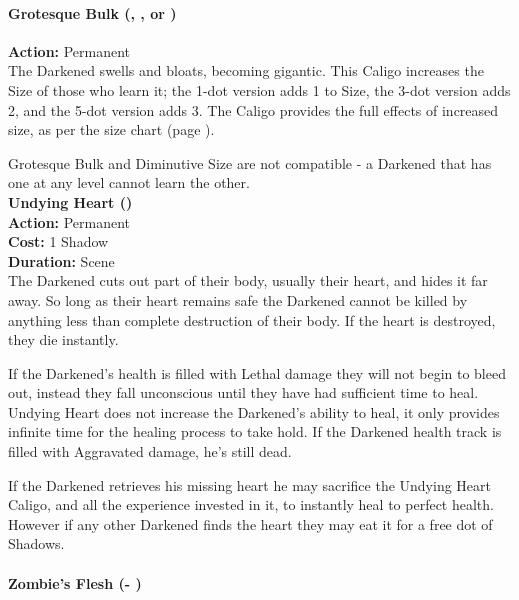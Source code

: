 \paragraph*{Grotesque Bulk (\textbullet, \textbullet\textbullet\textbullet, or \textbullet\textbullet\textbullet\textbullet\textbullet)} 

\noindent \textbf{Action:} Permanent \\

\noindent The Darkened swells and bloats, becoming gigantic. This Caligo increases the Size of those who learn it; the 1-dot version adds 1 to Size, the 3-dot version adds 2, and the 5-dot version adds 3. The Caligo provides the full effects of increased size, as per the size chart (page \pageref{SizeTable}).

Grotesque Bulk and Diminutive Size are not compatible - a Darkened that has one at any level cannot learn the other. \\

\noindent \textbf{Undying Heart (\textbullet\textbullet\textbullet\textbullet\textbullet)} \\

\noindent \textbf{Action:} Permanent\\

\noindent \textbf{Cost:} 1 Shadow\\

\noindent \textbf{Duration:} Scene \\

\noindent The Darkened cuts out part of their body, usually their heart, and hides it far away. So long as their heart remains safe the Darkened cannot be killed by anything less than complete destruction of their body. If the heart is destroyed, they die instantly. 

If the Darkened's health is filled with Lethal damage they will not begin to bleed out, instead they fall unconscious until they have had sufficient time to heal. Undying Heart does not increase the Darkened's ability to heal, it only provides infinite time for the healing process to take hold. If the Darkened health track is filled with Aggravated damage, he's still dead. 

If the Darkened retrieves his missing heart he may sacrifice the Undying Heart Caligo, and all the experience invested in it, to instantly heal to perfect health. However if any other Darkened finds the heart they may eat it for a free dot of Shadows. 

\paragraph*{Zombie's Flesh (\textbullet - \textbullet\textbullet\textbullet\textbullet\textbullet)} 


